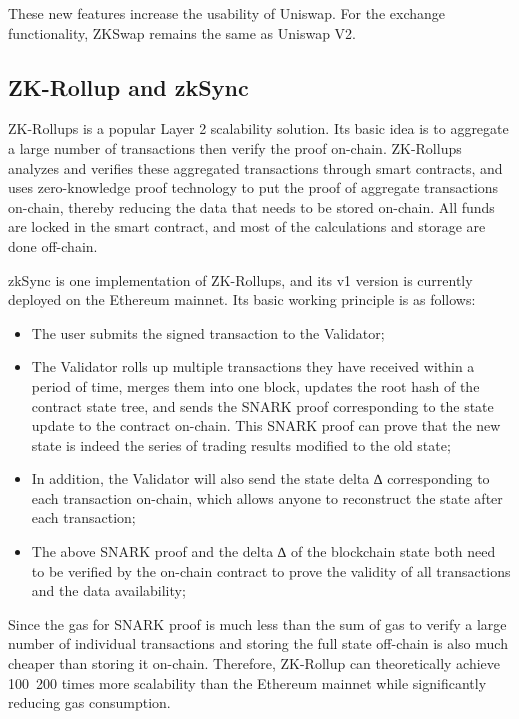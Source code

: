 \documentclass[]{template/llncs}
\begin{document}
These new features increase the usability of Uniswap. For the exchange functionality, ZKSwap remains the same as Uniswap V2.

\subsection{ZK-Rollup and zkSync}
ZK-Rollups is a popular Layer 2 scalability solution. Its basic idea is to aggregate a large number of transactions then verify the proof on-chain. ZK-Rollups analyzes and verifies these aggregated transactions through smart contracts, and uses zero-knowledge proof technology to put the proof of aggregate transactions on-chain, thereby reducing the data that needs to be stored on-chain. All funds are locked in the smart contract, and most of the calculations and storage are done off-chain.

zkSync\cite{zksync} is one implementation of ZK-Rollups, and its v1 version is currently deployed on the Ethereum mainnet. Its basic working principle is as follows:

\begin{itemize}
	\item The user submits the signed transaction to the Validator;
	\item The Validator rolls up multiple transactions they have received within a period of time, merges them into one block, updates the root hash of the contract state tree, and sends the SNARK proof corresponding to the state update to the contract on-chain. This SNARK proof can prove that the new state is indeed the series of trading results modified to the old state;
	\item In addition, the Validator will also send the state delta ∆ corresponding to each transaction on-chain, which allows anyone to reconstruct the state after each transaction;
	\item The above SNARK proof and the delta ∆ of the blockchain state both need to be verified by the on-chain contract to prove the validity of all transactions and the data availability; 
\end{itemize}

Since the gas for SNARK proof is much less than the sum of gas to verify a large number of individual transactions and storing the full state off-chain is also much cheaper than storing it on-chain. Therefore, ZK-Rollup can theoretically achieve 100~200 times more scalability than the Ethereum mainnet while significantly reducing gas consumption.
\end{document}

